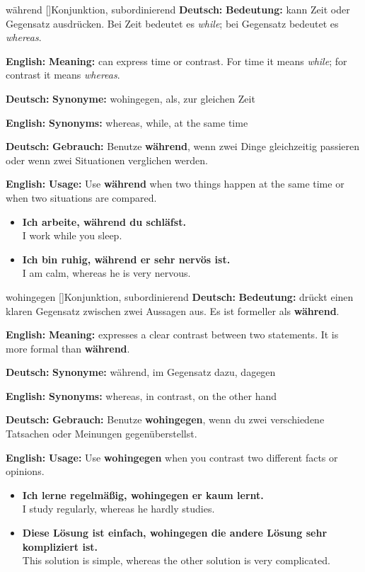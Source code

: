 \documentclass[a4paper,11pt]{article}
\newcommand{\GermanText}[1]{\textbf{Deutsch: }#1\par}
\newcommand{\EnglishText}[1]{{\small\color{SoftGray}\textbf{English: }#1\par}}
\newcommand{\ExampleItem}[2]{\item \textbf{#1}\\{\small\color{SoftGray}#2}}
\begin{document}
\begin{grammarentry}{während []}{Konjunktion, subordinierend}
\GermanText{\textbf{Bedeutung:} kann Zeit oder Gegensatz ausdrücken. Bei Zeit bedeutet es \textit{while}; bei Gegensatz bedeutet es \textit{whereas}.}
\EnglishText{\textbf{Meaning:} can express time or contrast. For time it means \textit{while}; for contrast it means \textit{whereas}.}

\GermanText{\textbf{Synonyme:} wohingegen, als, zur gleichen Zeit}
\EnglishText{\textbf{Synonyms:} whereas, while, at the same time}

\GermanText{\textbf{Gebrauch:} Benutze \textbf{während}, wenn zwei Dinge gleichzeitig passieren oder wenn zwei Situationen verglichen werden.}
\EnglishText{\textbf{Usage:} Use \textbf{während} when two things happen at the same time or when two situations are compared.}

\begin{exbox}
\begin{itemize}
    \ExampleItem{Ich arbeite, während du schläfst.}{I work while you sleep.}
    \ExampleItem{Ich bin ruhig, während er sehr nervös ist.}{I am calm, whereas he is very nervous.}
\end{itemize}
\end{exbox}
\end{grammarentry}

\begin{grammarentry}{wohingegen []}{Konjunktion, subordinierend}
\GermanText{\textbf{Bedeutung:} drückt einen klaren Gegensatz zwischen zwei Aussagen aus. Es ist formeller als \textbf{während}.}
\EnglishText{\textbf{Meaning:} expresses a clear contrast between two statements. It is more formal than \textbf{während}.}

\GermanText{\textbf{Synonyme:} während, im Gegensatz dazu, dagegen}
\EnglishText{\textbf{Synonyms:} whereas, in contrast, on the other hand}

\GermanText{\textbf{Gebrauch:} Benutze \textbf{wohingegen}, wenn du zwei verschiedene Tatsachen oder Meinungen gegenüberstellst.}
\EnglishText{\textbf{Usage:} Use \textbf{wohingegen} when you contrast two different facts or opinions.}

\begin{exbox}
\begin{itemize}
    \ExampleItem{Ich lerne regelmäßig, wohingegen er kaum lernt.}{I study regularly, whereas he hardly studies.}
    \ExampleItem{Diese Lösung ist einfach, wohingegen die andere Lösung sehr kompliziert ist.}{This solution is simple, whereas the other solution is very complicated.}
\end{itemize}
\end{exbox}
\end{grammarentry}
\end{document}
